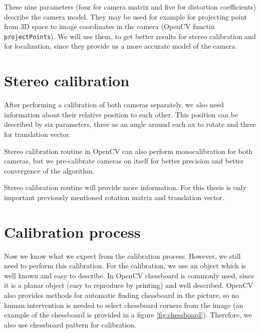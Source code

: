 These nine parameters (four for camera matrix and five for distortion
coefficients) describe the camera model. They may be used for example for
projecting point from 3D space to image coordinates in the camera (OpenCV
functin \verb+projectPoints+). We will use them, to get better results for
stereo calibration and for localization, since they provide us a more accurate
model of the camera.



\section{Stereo calibration}

After performing a calibration of both cameras separately, we also need
information about their relative position to each other. This position can be
described by six parameters, three as an angle around each ax to rotate and
three for translation vector.

Stereo calibration routine in OpenCV can also perform monocalibration for both
cameras, but we pre-calibrate cameras on itself for better precision and better
convergence of the algorithm.

Stereo calibration routine will provide more information. For this thesis is
only important previously mentioned rotation matrix and translation vector.

\section{Calibration process}

Now we know what we expect from the calibration process. However, we still need to
perform this calibration. For the calibration, we use an object which is well
known and easy to describe. In OpenCV chessboard is commonly used, since it is
a planar object (easy to reproduce by printing) and well described. OpenCV also
provides methods for automatic finding chessboard in the picture, so no human
intervention is needed to select chessboard corners from the image (an example
of the chessboard is provided in a figure \ref{fig:chessboard}). Therefore, we
also use chessboard pattern for calibration.

